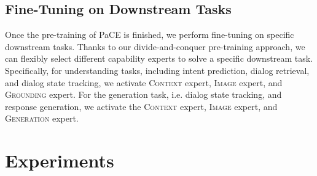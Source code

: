 \documentclass[11pt]{article}
\begin{document}
\subsection{Fine-Tuning on Downstream Tasks}
Once the pre-training of PaCE is finished, we perform fine-tuning on specific downstream tasks. Thanks to our divide-and-conquer 
pre-training approach, we can flexibly select different capability experts to solve a specific downstream task. 
Specifically, for understanding tasks, including intent prediction, dialog retrieval, and dialog state tracking, we activate \textsc{Context} expert, \textsc{Image} expert, and \textsc{Grounding} expert. 
For the generation task, i.e. dialog state tracking, and response generation, we activate the \textsc{Context} expert, \textsc{Image} expert, and \textsc{Generation} expert. 




\section{Experiments}
\end{document}
